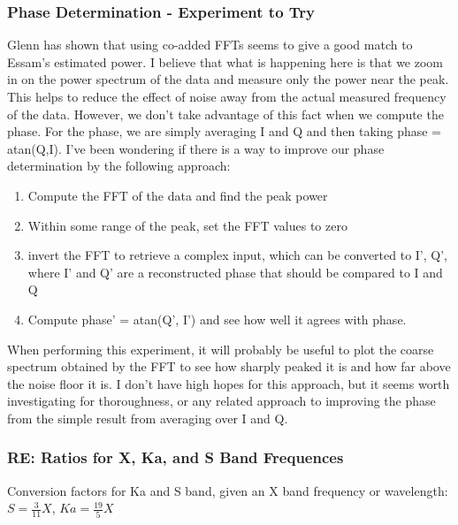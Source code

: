 \documentclass[crop=false,class=article,oneside]{standalone}
\begin{document}
\subsubsection{\footnotesize Phase Determination - Experiment to Try}
Glenn has shown that using co-added FFTs seems to give a good match to Essam's estimated power. I believe that what is happening here is that we zoom in on the power spectrum of the data and measure only the power near the peak. This helps to reduce the effect of noise away from the actual measured frequency of the data. However, we don't take advantage of this fact when we compute the phase. For the phase, we are simply averaging I and Q and then taking phase = atan(Q,I). I've been wondering if there is a way to improve our phase determination by the following approach:
\begin{enumerate}
    \item Compute the FFT of the data and find the peak power
    \item Within some range of the peak, set the FFT values to zero
    \item invert the FFT to retrieve a complex input, which can be converted to I', Q', where I' and Q' are a reconstructed phase that should be compared to I and Q
    \item Compute phase' = atan(Q', I') and see how well it agrees with phase.
\end{enumerate}
When performing this experiment, it will probably be useful to plot the coarse spectrum obtained by the FFT to see how sharply peaked it is and how far above the noise floor it is. I don't have high hopes for this approach, but it seems worth investigating for thoroughness, or any related approach to improving the phase from the simple result from averaging over I and Q.
\subsubsection{\footnotesize RE: Ratios for X, Ka, and S Band Frequences}
Conversion factors for Ka and S band, given an X band frequency or wavelength: $S=\frac{3}{11}X$, $Ka=\frac{19}{5}X$
\end{document}
